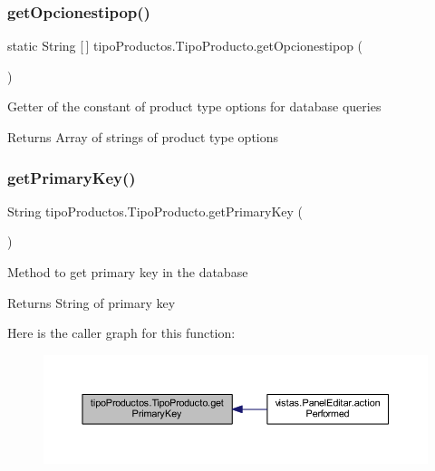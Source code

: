 \subsubsection{\texorpdfstring{get\+Opcionestipop()}{getOpcionestipop()}}
{\footnotesize\ttfamily static String \mbox{[}$\,$\mbox{]} tipo\+Productos.\+Tipo\+Producto.\+get\+Opcionestipop (\begin{DoxyParamCaption}{ }\end{DoxyParamCaption})\hspace{0.3cm}{\ttfamily [static]}}

Getter of the constant of product type options for database queries

\begin{DoxyReturn}{Returns}
Array of strings of product type options 
\end{DoxyReturn}
\mbox{\label{classtipo_productos_1_1_tipo_producto_aca3b6c0276f1694c3032a7a512ac0910}} 
\subsubsection{\texorpdfstring{get\+Primary\+Key()}{getPrimaryKey()}}
{\footnotesize\ttfamily String tipo\+Productos.\+Tipo\+Producto.\+get\+Primary\+Key (\begin{DoxyParamCaption}{ }\end{DoxyParamCaption})}

Method to get primary key in the database

\begin{DoxyReturn}{Returns}
String of primary key 
\end{DoxyReturn}
Here is the caller graph for this function\+:
\nopagebreak
\begin{figure}[H]
\begin{center}
\leavevmode
\includegraphics[width=350pt]{classtipo_productos_1_1_tipo_producto_aca3b6c0276f1694c3032a7a512ac0910_icgraph}
\end{center}
\end{figure}
\mbox{\label{classtipo_productos_1_1_tipo_producto_aae44943664780128543661f741a3089b}} 

